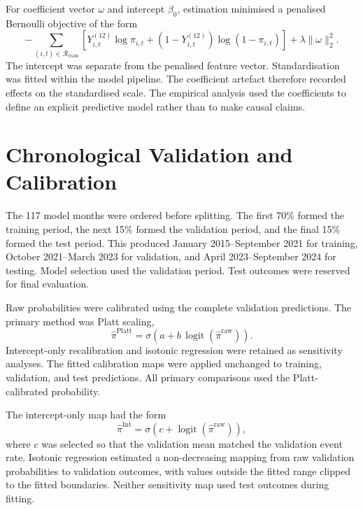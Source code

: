 For coefficient vector $\omega$ and intercept $\beta_0$, estimation minimised a penalised Bernoulli objective of the form
\begin{equation}
-\sum_{(i,t)\in\mathcal{R}_{\mathrm{train}}}
\left[Y_{i,t}^{(12)}\log\pi_{i,t}+(1-Y_{i,t}^{(12)})\log(1-\pi_{i,t})\right]
+\lambda\lVert\omega\rVert_2^2.
\label{eq:penalised-logit}
\end{equation}
The intercept was separate from the penalised feature vector. Standardisation was fitted within the model pipeline. The coefficient artefact therefore recorded effects on the standardised scale. The empirical analysis used the coefficients to define an explicit predictive model rather than to make causal claims.

\section{Chronological Validation and Calibration}

The 117 model months were ordered before splitting. The first 70\% formed the training period, the next 15\% formed the validation period, and the final 15\% formed the test period. This produced January 2015--September 2021 for training, October 2021--March 2023 for validation, and April 2023--September 2024 for testing. Model selection used the validation period. Test outcomes were reserved for final evaluation.

Raw probabilities were calibrated using the complete validation predictions. The primary method was Platt scaling,
\begin{equation}
\widehat\pi^{\mathrm{Platt}}
=
\sigma\!\left(a+b\,\operatorname{logit}(\widehat\pi^{\mathrm{raw}})\right).
\label{eq:platt-calibration}
\end{equation}
Intercept-only recalibration and isotonic regression were retained as sensitivity analyses. The fitted calibration maps were applied unchanged to training, validation, and test predictions. All primary comparisons used the Platt-calibrated probability.

The intercept-only map had the form
\begin{equation}
\widehat\pi^{\mathrm{Int}}
=
\sigma\!\left(c+\operatorname{logit}(\widehat\pi^{\mathrm{raw}})\right),
\label{eq:intercept-calibration}
\end{equation}
where $c$ was selected so that the validation mean matched the validation event rate. Isotonic regression estimated a non-decreasing mapping from raw validation probabilities to validation outcomes, with values outside the fitted range clipped to the fitted boundaries. Neither sensitivity map used test outcomes during fitting.

